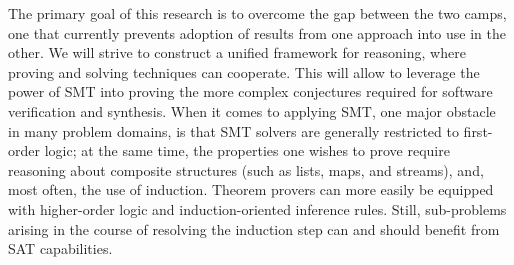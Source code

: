 \medskip
The primary goal of this research is to overcome the gap between the two camps,
one that currently prevents adoption of results from one approach into use in
the other.
We will strive to construct a unified framework for reasoning, where proving
and solving techniques can cooperate.
This will allow to leverage the power of SMT into proving the more complex
conjectures required for software verification and synthesis.
When it comes to applying SMT, one major obstacle in many problem domains, is
that SMT solvers are generally restricted to first-order logic; at the same time,
the properties one wishes to prove require reasoning about composite structures (such as lists, maps, and streams), and, most often, the use of induction.
Theorem provers can more easily be equipped with higher-order logic and induction-oriented inference
rules.
Still, sub-problems arising in the course of resolving the induction step can
and should benefit from SAT capabilities.


